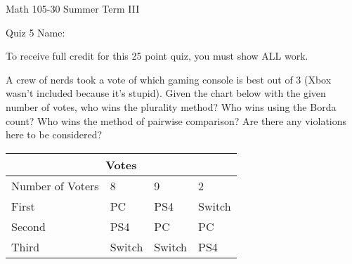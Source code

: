 \documentclass[11pt,epsfig]{article}
\begin{document}
Math 105-30 Summer Term III 

Quiz 5 \hspace{1.9in} {Name:} {\underline {\hspace{3.5in}}}
\vspace{1pc}

To receive full credit for this 25 point quiz, you must show ALL work.
\vspace{1pc}

\begin{problem}{25}
A crew of nerds took a vote of which gaming console is best out of 3 (Xbox wasn't included because it's stupid). Given the chart below with the given number of votes, who wins the plurality method? Who wins using the Borda count? Who wins the method of pairwise comparison? Are there any violations here to be considered?

\begin{tabular}{ |p{3cm}||p{3cm}|p{3cm}|p{3cm}|  }
 \hline
 \multicolumn{4}{|c|}{Votes} \\
 \hline
 Number of Voters &8&9&2\\
 \hline
 First   &    PC      &PS4    &  Switch\\
 Second&  PS4    & PC      &  PC\\
 Third &    Switch &Switch&  PS4\\
 \hline
\end{tabular}

\vfill
\end{problem}





\showpoints
\end{document}
